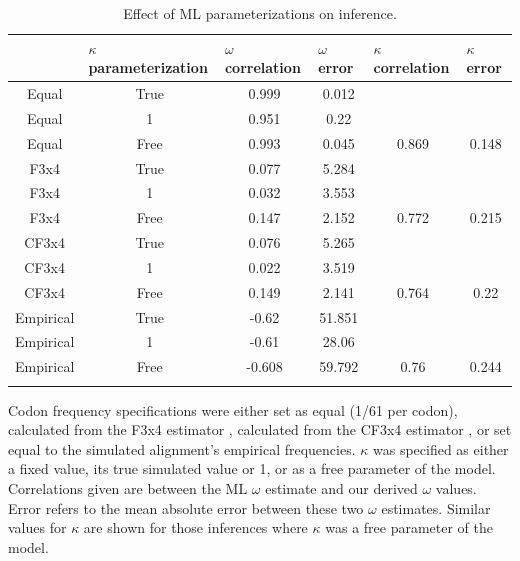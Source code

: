 \documentclass[11pt]{article}
\begin{document}
	

\begin{table}[htbp]
\caption {\label{tab:mlspec}Effect of ML parameterizations on inference.}
\begin{tabular}{c c c c c c}
\hline\noalign{\smallskip}
\multicolumn{1}{l}{Codon frequencies} & \multicolumn{1}{l}{$\kappa$ parameterization} & \multicolumn{1}{l}{$\omega$ correlation} &\multicolumn{1}{l}{$\omega$ error} & \multicolumn{1}{l}{$\kappa$ correlation} &\multicolumn{1}{l}{$\kappa$ error} \\
\hline\noalign{\smallskip}
Equal & True & 0.999 & 0.012 &   &   \\ 
Equal & 1 & 0.951 & 0.22 &   &   \\ 
Equal & Free & 0.993 & 0.045 & 0.869 & 0.148 \\ 
F3x4 & True & 0.077 & 5.284 &   &   \\ 
F3x4 & 1 & 0.032 & 3.553 &   &   \\ 
F3x4 & Free & 0.147 & 2.152 & 0.772 & 0.215 \\ 
CF3x4 & True & 0.076 & 5.265 &   &   \\ 
CF3x4 & 1 & 0.022 & 3.519 &   &   \\ 
CF3x4 & Free & 0.149 & 2.141 & 0.764 & 0.22 \\ 
Empirical & True & -0.62 & 51.851 &   &   \\ 
Empirical & 1 & -0.61 & 28.06 &   &   \\ 
Empirical & Free & -0.608 & 59.792 & 0.76 & 0.244 \\ 

\noalign{\smallskip}\hline\noalign{\smallskip}
\end{tabular}
\newline
Codon frequency specifications were either set as equal (1/61 per codon), calculated from the F3x4 estimator \cite{MuseGaut1994}, calculated from the CF3x4 estimator \cite{Pond2010}, or set equal to the simulated alignment's empirical frequencies. $\kappa$ was specified as either a fixed value, its true simulated value or 1, or as a free parameter of the model. Correlations given are between the ML $\omega$ estimate and our derived $\omega$ values. Error refers to the mean absolute error between these two $\omega$ estimates. Similar values for $\kappa$ are shown for those inferences where $\kappa$ was a free parameter of the model.
\end{table}	
	
\end{document}
